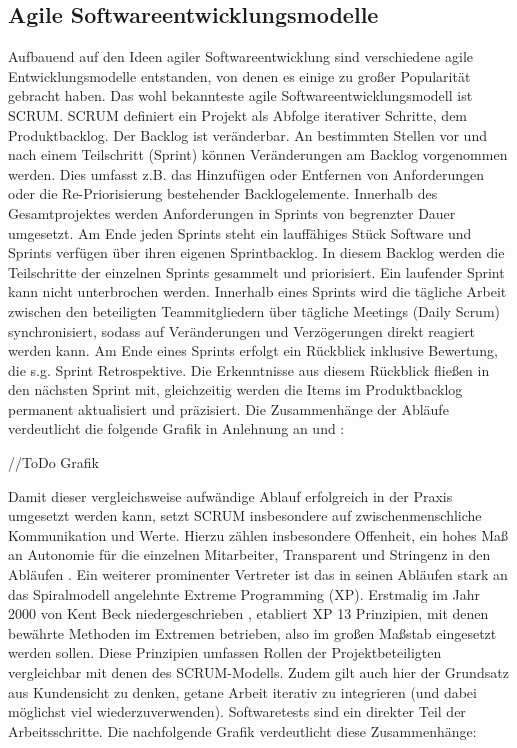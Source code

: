 \subsection{Agile Softwareentwicklungsmodelle}
\label{Agile Softwareentwicklungsmodelle}
Aufbauend auf den Ideen agiler Softwareentwicklung sind verschiedene agile Entwicklungsmodelle entstanden, von denen es einige zu großer Popularität gebracht haben. Das wohl bekannteste agile Softwareentwicklungsmodell ist \gls{SCRUM}.\newline
\gls{SCRUM} definiert ein Projekt als Abfolge iterativer Schritte, dem Produktbacklog. Der Backlog ist veränderbar. An bestimmten Stellen vor und nach einem Teilschritt (Sprint) können Veränderungen am Backlog vorgenommen werden. Dies umfasst z.B. das Hinzufügen oder Entfernen von Anforderungen oder die Re-Priorisierung bestehender Backlogelemente. Innerhalb des Gesamtprojektes werden Anforderungen in Sprints von begrenzter Dauer umgesetzt. Am Ende jeden Sprints steht ein lauffähiges Stück Software und Sprints verfügen über ihren eigenen Sprintbacklog. In diesem Backlog werden die Teilschritte der einzelnen Sprints gesammelt und priorisiert. Ein laufender Sprint kann nicht unterbrochen werden. Innerhalb eines Sprints wird die tägliche Arbeit zwischen den beteiligten Teammitgliedern über tägliche Meetings (Daily Scrum) synchronisiert, sodass auf Veränderungen und Verzögerungen direkt reagiert werden kann. Am Ende eines Sprints erfolgt ein Rückblick inklusive Bewertung, die s.g. Sprint Retrospektive. Die Erkenntnisse aus diesem Rückblick fließen in den nächsten Sprint mit, gleichzeitig werden die Items im Produktbacklog permanent aktualisiert und präzisiert. Die Zusammenhänge der Abläufe verdeutlicht die folgende Grafik in Anlehnung an \cite{SCRUM_Framework_nodate} und \cite[Abb. 1]{moniruzzaman2013comparative}:

//ToDo Grafik

Damit dieser vergleichsweise aufwändige Ablauf erfolgreich in der Praxis umgesetzt werden kann, setzt \gls{SCRUM} insbesondere auf zwischenmenschliche Kommunikation und Werte. Hierzu zählen insbesondere Offenheit, ein hohes Maß an Autonomie für die einzelnen Mitarbeiter, Transparent und Stringenz in den Abläufen \cite{SCRUM_values_nodate}.\newline
Ein weiterer prominenter Vertreter ist das in seinen Abläufen stark an das Spiralmodell angelehnte Extreme Programming (\acrshort{XP}). Erstmalig im Jahr 2000 von Kent Beck niedergeschrieben \cite{beck_extreme_2000}, etabliert \acrshort{XP} 13 Prinzipien, mit denen bewährte Methoden \glqq im Extremen\grqq{} betrieben, also im großen Maßstab eingesetzt werden sollen.
Diese Prinzipien umfassen Rollen der Projektbeteiligten vergleichbar mit denen des \gls{SCRUM}-Modells. Zudem gilt auch hier der Grundsatz aus Kundensicht zu denken, getane Arbeit iterativ zu integrieren (und dabei möglichst viel wiederzuverwenden). Softwaretests sind ein direkter Teil der Arbeitsschritte. Die nachfolgende Grafik verdeutlicht diese Zusammenhänge:

